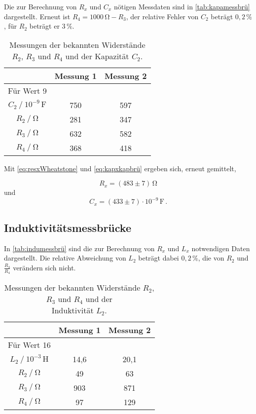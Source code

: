 Die zur Berechnung von $R_x$ und $C_x$ nötigen Messdaten sind in \autoref{tab:kapamessbrü}
dargestellt. Erneut ist $R_4 = 1000 \,\unit{\ohm} - R_3$, der relative Fehler von $C_2$ beträgt $0,2 \,\%$, für $R_2$
beträgt er $3 \,\%$.

\begin{table}[H]
  \centering
  \caption{Messungen der bekannten Widerstände $R_2$, $R_3$ und $R_4$ und der Kapazität $C_2$.}
  \label{tab:kapamessbrü}
  \begin{tabular}{S S S}
    \toprule
    & {Messung 1} & {Messung 2} \\
    \midrule
    {Für Wert 9} \\
    {$C_2 \mathbin{/} 10^{-9} \,\unit{\farad}$} &  750 & 597\\
                {$R_2 \mathbin{/} \unit{\ohm}$} &  281 & 347 \\
                {$R_3 \mathbin{/} \unit{\ohm}$} &  632 & 582 \\
                {$R_4 \mathbin{/} \unit{\ohm}$} &  368 & 418 \\
  \end{tabular}
\end{table}

Mit \eqref{eq:resxWheatstone} und \eqref{eq:kapxkapbrü} ergeben sich, erneut gemittelt,

\begin{equation*}
  R_x = (483 \pm 7) \,\unit{\ohm}
\end{equation*}
und
\begin{equation*}
  C_x = (433 \pm 7) \cdot 10^{-9} \,\unit{\farad} \,.
\end{equation*}


\subsection{Induktivitätsmessbrücke}

In \autoref{tab:indumessbrü} sind die zur Berechnung von $R_x$ und $L_x$ notwendigen Daten dargestellt.
Die relative Abweichung von $L_2$ beträgt dabei $0,2 \,\%$, die von $R_2$ und $\frac{R_3}{R_4}$ verändern
sich nicht.

\begin{table}[H]
  \centering
  \caption{Messungen der bekannten Widerstände $R_2$, $R_3$ und $R_4$ und der \\ Induktivität $L_2$.}
  \label{tab:indumessbrü}
  \begin{tabular}{S S[table-format=3.1] S[table-format=3.1]}
    \toprule
    & {Messung 1} & {Messung 2} \\
    \midrule
    {Für Wert 16} \\
    {$L_2 \mathbin{/} 10^{-3} \,\unit{\henry}$} &   14,6  &    20,1   \\
                {$R_2 \mathbin{/} \unit{\ohm}$} &   49    &    63     \\
                {$R_3 \mathbin{/} \unit{\ohm}$} &  903    &   871     \\
                {$R_4 \mathbin{/} \unit{\ohm}$} &   97    &   129     \\
  \end{tabular}
\end{table}

